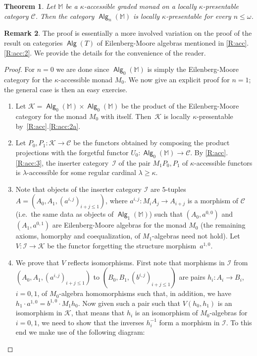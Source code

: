 \documentclass[sigconf,
			final%
			nonacm
                        ]{acmart}
\numberwithin{equation}{section}
\numberwithin{equation}{section}
\theoremstyle{plain}
\newtheorem{thm}{Theorem}[section]
\theoremstyle{definition}
\newtheorem{rem}[thm]{Remark}
\newcommand{\M}{\mathbb{M}}                   %
\newcommand{\CatC}{\mathscr{C}}           %
\newcommand{\CatK}{\mathscr{K}}
\newcommand{\CatI}{\mathscr{I}}
\DeclareMathOperator{\Alg}{\mathsf{Alg}}
\begin{document}
\begin{thm}\label{T:acc}
  Let $\M$ be a $\kappa$-accessible graded monad on a locally
  $\kappa$-presentable category $\CatC$. Then the category
  $\Alg_n(\M)$ is locally $\kappa$-presentable for every
  $n \leq \omega$.
\end{thm}
%
\begin{rem}
  The proof is essentially a more involved variation on the proof of
  the result on categories $\Alg(T)$ of Eilenberg-Moore algebras
  mentioned in \cref{R:acc}.\ref{R:acc:2}. We provide the details
  for the convenience of the reader.
\end{rem}
%
\begin{proof}
  For $n = 0$ we are done since $\Alg_0(\M)$ is simply the
  Eilenberg-Moore category for the $\kappa$-accessible monad $M_0$. We
  now give an explicit proof for $n=1$; the general case is then an
  easy exercise.
  \begin{enumerate}
  \item Let $\CatK = \Alg_0(\M) \times \Alg_0(\M)$ be the product of
    the Eilenberg-Moore category for the monad $M_0$ with
    itself. Then~$\CatK$ is locally $\kappa$-presentable
    by~\cref{R:acc}.\ref{R:acc:2a}.

  \item Let $P_0, P_1\colon \CatK \to \CatC$ be the functors obtained
    by composing the product projections with the forgetful functor
    $U_0\colon \Alg_0(\M) \to \CatC$. By \cref{R:acc}.\ref{R:acc:3},
    the inserter category~$\CatI$ of the pair $M_1P_0, P_1$ of
    $\kappa$-accessible functors is $\lambda$-accessible for some
    regular cardinal $\lambda \geq \kappa$.

  \item Note that objects of the inserter category $\CatI$ are
    $5$-tuples $A = (A_0, A_1, (a^{i,j})_{i+j \leq 1})$, where
    $a^{i,j}\colon M_iA_j \to A_{i+j}$ is a morphism of $\CatC$
    (i.e.~the same data as objects of $\Alg_1(\M)$) such that
    $(A_0,a^{0,0})$ and $(A_1, a^{0,1})$ are Eilenberg-Moore algebras
    for the monad $M_0$ (the remaining axioms, homorphy and
    coequalization, of $M_1$-algebras need not hold). Let
    $V\colon \CatI \to \CatK$ be the functor forgetting the structure
    morphism~$a^{1,0}$.

  \item We prove that $V$ reflects isomorphisms. First note that
    morphisms in $\CatI$ from $(A_0, A_1, (a^{i,j})_{i+j \leq 1})$ to
    $(B_0, B_1, (b^{i,j})_{i+j \leq 1})$ are pairs $h_i\colon A_i \to
    B_i$, $i=0,1$, of $M_0$-algebra homomorphisms such that, in addition,
    we have $h_1 \cdot a^{1,0} = b^{1,0} \cdot M_1h_0$. Now given such
    a pair such that $V(h_0,h_1)$ is an isomorphism in $\CatK$, that
    means that $h_i$ is an isomorphism of $M_0$-algebras for $i = 0,1$, we need to show
    that the inverses $h_i^{-1}$ form a morphism in $\CatI$. To this
    end we make use of the following diagram:


\end{enumerate}
\end{proof}
\end{document}
